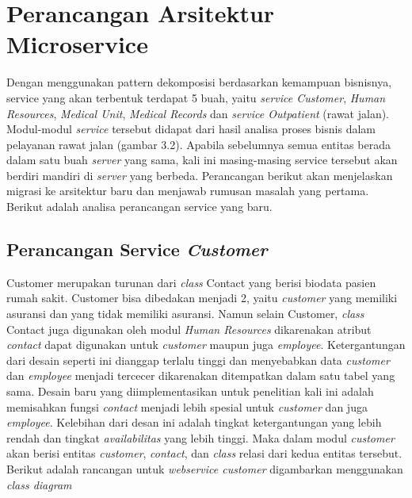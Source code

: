 \section{Perancangan Arsitektur Microservice}
Dengan menggunakan pattern dekomposisi berdasarkan kemampuan bisnisnya, service yang akan terbentuk terdapat 5 buah, yaitu \textit{service Customer}, \textit{Human Resources}, \textit{Medical Unit}, \textit{Medical Records} dan \textit{service Outpatient} (rawat jalan). Modul-modul \textit{service} tersebut didapat dari hasil analisa proses bisnis dalam pelayanan rawat jalan (gambar 3.2). Apabila sebelumnya semua entitas berada dalam satu buah \textit{server} yang sama, kali ini masing-masing service tersebut akan berdiri mandiri di \textit{server} yang berbeda. Perancangan berikut akan menjelaskan migrasi ke arsitektur baru dan menjawab rumusan masalah yang pertama. Berikut adalah analisa perancangan service yang baru.
\subsection{Perancangan Service \textit{Customer}}
Customer merupakan turunan dari \textit{class} Contact yang berisi biodata pasien rumah sakit. Customer bisa dibedakan menjadi 2, yaitu \textit{customer} yang memiliki asuransi dan yang tidak memiliki asuransi. Namun selain Customer, \textit{class} Contact juga digunakan oleh modul \textit{Human Resources} dikarenakan atribut \textit{contact} dapat digunakan untuk \textit{customer} maupun juga \textit{employee}. Ketergantungan dari desain seperti ini dianggap terlalu tinggi dan menyebabkan data \textit{customer} dan \textit{employee} menjadi tercecer dikarenakan ditempatkan dalam satu tabel yang sama.
Desain baru yang diimplementasikan untuk penelitian kali ini adalah memisahkan fungsi \textit{contact} menjadi lebih spesial untuk \textit{customer} dan juga \textit{employee}. Kelebihan dari desan ini adalah tingkat ketergantungan yang lebih rendah dan tingkat \textit{availabilitas} yang lebih tinggi. Maka dalam modul \textit{customer} akan berisi entitas \textit{customer}, \textit{contact}, dan \textit{class} relasi dari kedua entitas tersebut.\\
Berikut adalah rancangan untuk \textit{webservice customer} digambarkan menggunakan \textit{class diagram}

